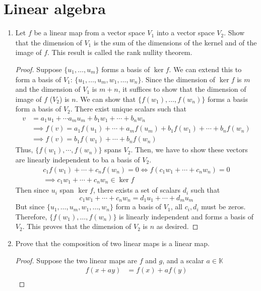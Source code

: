 \section{Linear algebra}
\begin{enumerate}
	\item Let $f$ be a linear map from a vector space $V_1$ into a vector space $V_2$.
    Show that the dimension of $V_1$ is the sum of the dimensions of the kernel and of the image of $f$.
	This result is called the rank nullity theorem.
	\begin{proof}
	Suppose \(\{{u}_{1},\ldots ,{u}_{m}\}\) forms a basis of \(\ker f\).
	We can extend this to form a basis of $V_1$: \(\{{u}_{1},\ldots ,{u}_{m},{w}_{1},\ldots,{w}_{n}\}\).
	Since the dimension of $\ker f$ is $m$ and the dimension of $V_1$ is \(m + n\), it suffices to show that the dimension of image of $f$ ($V_2$) is $n$.
	We can show that \(\{f({w}_{1}),\ldots,f({w}_{n})\}\) forms a basis form a basis of $V_2$.
	There exist unique scalars such that
	\begin{align*}
		v&=a_1u_1+\cdots a_m u_m+b_1 w_1+\cdots+ b_n w_n\\
		&\implies f(v)=a_1 f(u_1)+\cdots+ a_m f(u_m)+b_1 f(w_1)+\cdots+ b_n f(w_n)\\
		&\implies f(v)=b_1 f(w_1)+\cdots+ b_n f(w_n)
	\end{align*}
	Thus, \(\{f(w_1),\cdots, f(w_n)\} \) spans $V_2$.
	Then, we have to show these vectors are linearly independent to ba a basis of $V_2$.
	\begin{align*}
		c_1 f(w_1)+\cdots+c_n f(w_n)=0 \iff f(c_1w_1+\cdots+c_n w_n)=0\\
		\implies c_1w_1+\cdots+c_n w_n\in \ker f
	\end{align*}
	Then since $u_i$ span $\ker f$, there exists a set of scalars $d_i$ such that
	\[ c_1w_1+\cdots+c_n w_n=d_1u_1+\cdots+d_m u_m \]
	But since \(\{{u}_{1},\ldots ,{u}_{m}, {w}_{1}, \ldots,{w}_{n}\}\) form a basis of $V_1$, all $c_i,d_i$ must be zeros.
	Therefore, \sloppy \(\{f({w}_{1}), \ldots, f({w}_{n})\}\) is linearly independent and forms a basis of $V_2$.
	This proves that the dimension of $V_2$ is $n$ as desired.
	\end{proof}
    \item Prove that the composition of two linear maps is a linear map.
	\begin{proof}
	Suppose the two linear maps are $f$ and $g$, and a scalar \(a\in\mathbb{K}\)
	\begin{align*}
		f(x+ay)&=f(x)+a f(y)\\

\end{align*}
\end{proof}
\end{enumerate}
